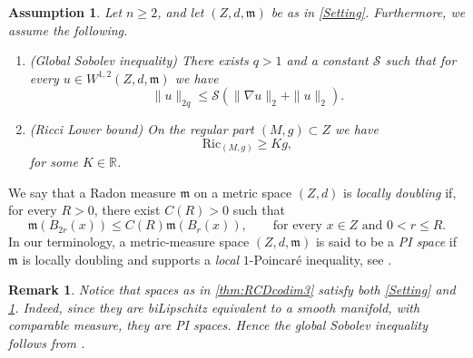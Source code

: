 \documentclass[12pt,a4paper,reqno]{amsart}
\newtheorem{assumptions}[theorem]{Assumption}
\newtheorem{remark}[theorem]{Remark}
\renewcommand{\leq}{\leqslant}
\renewcommand{\geq}{\geqslant}
\begin{document}
\begin{assumptions}\label{assumptions}
    Let $n\geq 2$, and let $(Z,d,\mathfrak{m})$ be as in \cref{Setting}. Furthermore, we assume the following.
    \begin{enumerate}
        \item (Global Sobolev inequality) There exists $q>1$ and a constant $\mathcal{S}$ such that for every $u\in W^{1,2}(Z,d,\mathfrak{m})$ we have 
        \begin{equation}\label{eqn:GlobalSobolev}
            \|u\|_{2q}\leq \mathcal{S}\left(\|\nabla u\|_2+\|u\|_2\right).
        \end{equation}
        \item (Ricci Lower bound) On the regular part $(M,g)\subset Z$ we have 
        \begin{equation}\label{eqn:RicciControl}
        \mathrm{Ric}_{(M,g)} \geq Kg,
        \end{equation}
        for some $K\in\mathbb R$. 
    \end{enumerate}
\end{assumptions}
We say that a Radon measure $\mathfrak{m}$ on a metric space $(Z,d)$ is \textit{locally doubling} if, for every $R>0$, there exist $C(R)>0$ such that 
\[
\mathfrak{m}(B_{2r}(x))\leq C(R)\mathfrak{m}(B_r(x)), \qquad \text{for every $x\in Z$ and $0<r\leq R$.}
\]
In our terminology, a metric-measure space $(Z,d,\mathfrak{m})$ is said to be a \textit{PI space} if $\mathfrak{m}$ is locally doubling and supports a \textit{local} $1$-Poincaré inequality, see \cite[Section 8.1]{HKST15}.
\begin{remark}\label{rem:LinftyArePi}
    Notice that spaces as in \cref{thm:RCDcodim3} satisfy both \cref{Setting} and \cref{assumptions}. Indeed, since they are biLipschitz equivalent to a smooth manifold, with comparable measure, they are PI spaces. Hence the global Sobolev inequality follows from \cite[Theorem 5.1(1)]{HK00}.
\end{remark}
\end{document}
